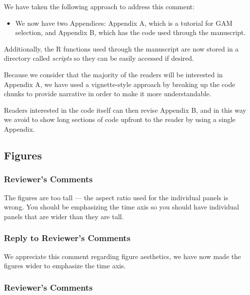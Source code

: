 \documentclass[
]{article}
\providecommand{\tightlist}{%
  \setlength{\itemsep}{0pt}\setlength{\parskip}{0pt}}
\begin{document}
We have taken the following approach to address this comment:

\begin{itemize}
\tightlist
\item
  We now have two Appendices: Appendix A, which is a tutorial for GAM selection, and Appendix B, which has the code used through the manuscript.
\end{itemize}

Additionally, the R functions used through the manuscript are now stored in a directory called \emph{scripts} so they can be easily accessed if desired.

Because we consider that the majority of the readers will be interested in Appendix A, we have used a vignette-style approach by breaking up the code chunks to provide narrative in order to make it more understandable.

Readers interested in the code itself can then revise Appendix B, and in this way we avoid to show long sections of code upfront to the reader by using a single Appendix.

\hypertarget{figures}{%
\subsection{Figures}\label{figures}}

\hypertarget{reviewers-comments-14}{%
\subsubsection{Reviewer's Comments}\label{reviewers-comments-14}}

The figures are too tall --- the aspect ratio used for the individual panels is wrong. You should be emphasizing the time axis so you should have individual panels that are wider than they are tall.

\hypertarget{section-15}{%
\subsubsection{\texorpdfstring{\textcolor{reviewersblue} {Reply to Reviewer's Comments}}{}}\label{section-15}}

We appreciate this comment regarding figure aesthetics, we have now made the figures wider to emphasize the time axis.

\hypertarget{reviewers-comments-15}{%
\subsubsection{Reviewer's Comments}\label{reviewers-comments-15}}
\end{document}
